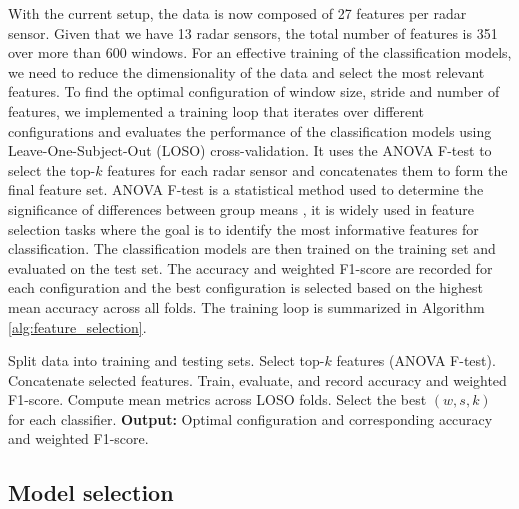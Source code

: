 \documentclass{article}
\begin{document}
With the current setup, the data is now composed of 27 features per radar sensor. Given that we have 13 radar sensors, the total number of features is 351 over more than 600 windows. For an effective training of the classification models, we need to reduce the dimensionality of the data and select the most relevant features. To find the optimal configuration of window size, stride and number of features, we implemented a training loop that iterates over different configurations and evaluates the performance of the classification models using Leave-One-Subject-Out (LOSO) cross-validation. It uses the ANOVA F-test to select the top-$k$ features for each radar sensor and concatenates them to form the final feature set. ANOVA F-test is a statistical method used to determine the significance of differences between group means \cite{anova2021}, it is widely used in feature selection tasks where the goal is to identify the most informative features for classification. The classification models are then trained on the training set and evaluated on the test set. The accuracy and weighted F1-score are recorded for each configuration and the best configuration is selected based on the highest mean accuracy across all folds. The training loop is summarized in Algorithm \ref{alg:feature_selection}.

\begin{algorithm}[!t]
\caption{Feature Selection and LOSO Classification}
\label{alg:feature_selection}
\begin{algorithmic}
            \STATE Split data into training and testing sets.
                \STATE Select top-$k$ features (ANOVA F-test).
            \ENDFOR
            \STATE Concatenate selected features.
                \STATE Train, evaluate, and record accuracy and weighted F1-score.
            \ENDFOR
        \ENDFOR
        \STATE Compute mean metrics across LOSO folds.
    \ENDFOR
\ENDFOR
\STATE Select the best $(w,s,k)$ for each classifier.
\STATE \textbf{Output:} Optimal configuration and corresponding accuracy and weighted F1-score.
\end{algorithmic}
\end{algorithm}

\subsection{Model selection}
\end{document}
